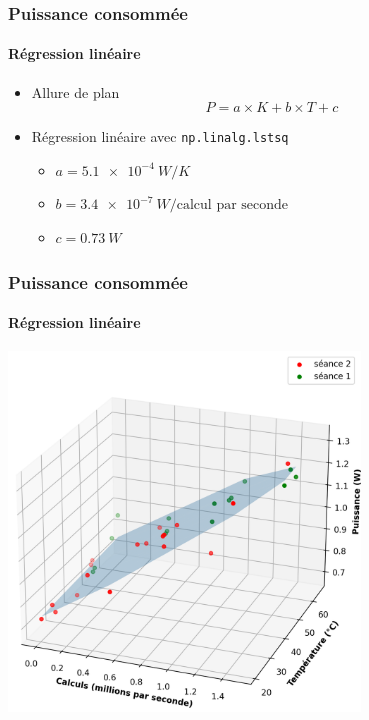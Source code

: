 \documentclass[a4paper,11pt]{beamer}
\newcommand{\p}{\texttt} %
\begin{document}
\begin{frame}
    \frametitle{Puissance consommée}
    \framesubtitle{Régression linéaire}

    \begin{itemize}
        \item Allure de plan
        $$P = a \times K + b \times T + c$$
        \item Régression linéaire avec \p{np.linalg.lstsq}
        \begin{itemize}
            \item $a = \SI{5.1e-4}{W/K}$
            \item $b = \SI{3.4e-7}{W/\text{calcul par seconde}}$
            \item $c = \SI{0.73}{W}$
        \end{itemize}
    \end{itemize}
\end{frame}

\begin{frame}
    \frametitle{Puissance consommée}
    \framesubtitle{Régression linéaire}

    \includegraphics[width=0.7\textwidth]{plan.png}
\end{frame}
\end{document}
